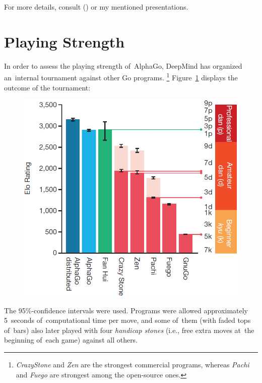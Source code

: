 For more details, consult (\cite{Silver2016mastering}) or my mentioned presentations.


\section{Playing Strength}
In order to assess the playing strength of~AlphaGo, DeepMind has organized an~internal tournament against other Go programs.%
\footnote{\emph{CrazyStone} and \emph{Zen} are the strongest commercial programs, whereas \emph{Pachi} and \emph{Fuego} are strongest among the open-source ones.}
Figure~\ref{fig:Go-tournament} displays the outcome of the tournament:
\begin{figure}[H]
  \centering
  \includegraphics[width=.45\textwidth]{../img/results_of_tournament.png}
  \label{fig:Go-tournament}
\end{figure}
The 95\%-confidence intervals were used.
Programs were allowed approximately 5~seconds of~computational time per move, and some of~them (with faded tops of~bars) also later played with four \emph{handicap stones} (i.e., free extra moves at~the beginning of~each game) against all others.

